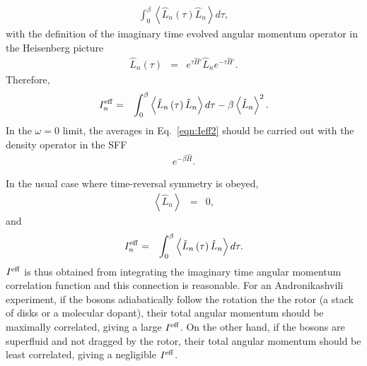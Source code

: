 \documentclass[12pt]{iopart}
\begin{document}
\begin{eqnarray}
\int_0^\beta \left< \hat{L}_n\left( \tau \right) \hat{L}_n \right> d\tau,
\end{eqnarray}
with the definition of the imaginary time evolved angular momentum operator in the Heisenberg picture
\begin{eqnarray}
\hat{L}_n\left( \tau \right)&=&e^{ \tau\hat{H}' }\hat{L}_n e^{ -\tau\hat{H}' }.
\end{eqnarray}
Therefore,
\begin{eqnarray}
I^{\rm eff}_n&=&\int_0^\beta \left< \hat{L}_n\left( \tau \right) \hat{L}_n \right> d\tau-\beta\left< \hat{L}_n\right>^2. \label{eqn:Ieff2}
\end{eqnarray}
In the $\omega=0$ limit, the averages in Eq.~\ref{eqn:Ieff2} should be carried out with the density operator in the SFF
\begin{eqnarray}
e^{-\beta\hat{H}}.
\end{eqnarray} 

In the usual case where time-reversal symmetry is obeyed,
\begin{eqnarray}
\left< \hat{L}_n \right>&=&0,
\end{eqnarray}
and 
\begin{eqnarray}
I^{\rm eff}_n&=&\int_0^\beta \left< \hat{L}_n\left( \tau \right) \hat{L}_n \right> d\tau. \label{eqn:Ieff3}
\end{eqnarray}
$I^{\rm eff}$ is thus obtained from integrating the imaginary time angular momentum correlation function and this connection is reasonable. 
For an Andronikashvili experiment, if the bosons adiabatically follow the rotation the the rotor (a stack of disks or a molecular dopant), their total angular momentum should be maximally correlated, giving a large $I^{\rm eff}$. 
On the other hand, if the bosons are superfluid and not dragged by the rotor, their total angular momentum should be least correlated, giving a negligible $I^{\rm eff}$.
\end{document}

